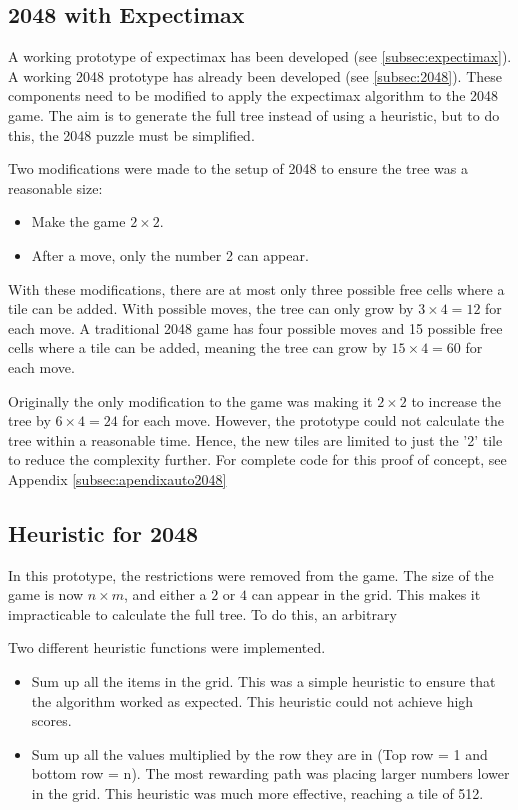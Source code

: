\documentclass{article}
\begin{document}
\subsection{2048 with Expectimax}


\label{subsec:2048_expectimax}
A working prototype of expectimax has been developed (see \ref{subsec:expectimax}). A working 2048 prototype has already been developed (see \ref{subsec:2048}).  These components need to be modified to apply the expectimax algorithm to the 2048 game. 
The aim is to generate the full tree instead of using a heuristic, but to do this, the 2048 puzzle must be simplified.

Two modifications were made to the setup of 2048 to ensure the tree was a reasonable size:
\begin{itemize}
    \item Make the game $2 \times 2$.
    \item After a move, only the number 2 can appear.
\end{itemize}
With these modifications, there are at most only three possible free cells where a tile can be added. With possible moves, the tree can only grow by $3 \times 4 = 12$ for each move.
A traditional 2048 game has four possible moves and 15 possible free cells where a tile can be added, meaning the tree can grow by $15 \times 4 = 60$ for each move.

Originally the only modification to the game was making it $2 \times 2$ to increase the tree by $6 \times 4 = 24$ for each move. However, the prototype could not calculate the tree within a reasonable time. Hence, the new tiles are limited to just the '2' tile to reduce the complexity further.
For complete code for this proof of concept, see Appendix \ref{subsec:apendixauto2048}
\subsection{Heuristic for 2048}
\label{subsec:heuristic}
In this prototype, the restrictions were removed from the game. The size of the game is now $n \times m$, and either a $2$ or $4$ can appear in the grid. This makes it impracticable to calculate the full tree. To do this, an arbitrary  %

Two different heuristic functions were implemented.
\begin{itemize}
    \item Sum up all the items in the grid. This was a simple heuristic to ensure that the algorithm worked as expected. This heuristic could not achieve high scores.
    \item Sum up all the values multiplied by the row they are in (Top row = 1 and bottom row = n). The most rewarding path was placing larger numbers lower in the grid.  This heuristic was much more effective, reaching a tile of 512.
\end{itemize}
\end{document}
